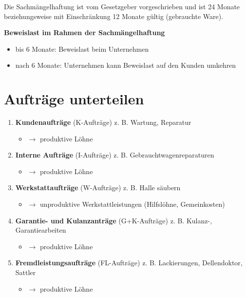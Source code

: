 Die Sachmängelhaftung ist vom Gesetzgeber vorgeschrieben und ist 24
Monate beziehungsweise mit Einschränkung 12 Monate gültig (gebrauchte
Ware).

\textbf{Beweislast im Rahmen der Sachmängelhaftung}

\begin{itemize}
\item
  bis 6 Monate: Beweislast beim Unternehmen
\item
  nach 6 Monate: Unternehmen kann Beweislast auf den Kunden umkehren
\end{itemize}

\newpage

\section{Aufträge unterteilen}\label{auftraege-unterteilen}

\begin{enumerate}
\item
  \textbf{Kundenaufträge} (K-Aufträge) z. B. Wartung, Reparatur

  \begin{itemize}
  \item
    $\to$ produktive Löhne
  \end{itemize}
\item
  \textbf{Interne Aufträge} (I-Aufträge) z. B. Gebrauchtwagenreparaturen

  \begin{itemize}
  \item
    $\to$ produktive Löhne
  \end{itemize}
\item
  \textbf{Werkstattaufträge} (W-Aufträge) z. B. Halle säubern

  \begin{itemize}
  \item
    $\to$ unproduktive Werkstattleistungen (Hilfslöhne, Gemeinkosten)
  \end{itemize}
\item
  \textbf{Garantie- und Kulanzanträge} (G+K-Aufträge) z. B. Kulanz-,
  Garantiearbeiten

  \begin{itemize}
  \item
    $\to$ produktive Löhne
  \end{itemize}
\item
  \textbf{Fremdleistungsaufträge} (FL-Aufträge) z. B. Lackierungen,
  Dellendoktor, Sattler

  \begin{itemize}
  \item
    $\to$ produktive Löhne
  \end{itemize}
\end{enumerate}

